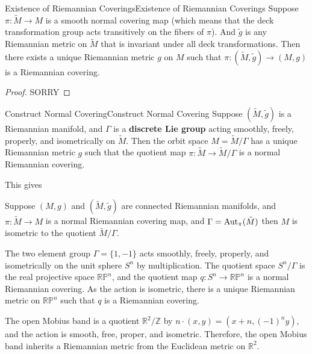 \documentclass[../main.tex]{subfiles}
\begin{document}
\begin{proposition}{Existence of Riemannian Coverings}{Existence of Riemannian Coverings}
	Suppose $\pi: \tilde{M} \to M$ is a smooth normal covering map (which means that the deck transformation group acts transitively on the fibers of $\pi$). And $\tilde{g}$ is any Riemannian metric on $\tilde{M}$ that is invariant under all deck transformations. Then there exists a unique Riemannian metric $g$ on $M$ such that $\pi: (\tilde{M}, \tilde{g}) \to (M, g)$ is a Riemannian covering.
\end{proposition}
\begin{proof}
	SORRY
\end{proof}

\begin{proposition}{Construct Normal Covering}{Construct Normal Covering}
	Suppose $(\tilde{M}, \tilde{g})$ is a Riemannian manifold, and $\Gamma$ is a \textbf{discrete Lie group} acting smoothly, freely, properly, and isometrically on $\tilde{M}$. Then the orbit space $M = \tilde{M}/\Gamma$ has a unique Riemannian metric $g$ such that the quotient map $\pi: \tilde{M} \to \tilde{M}/\Gamma$ is a normal Riemannian covering.
\end{proposition}

This gives
\begin{proposition}{}{}
	Suppose $(M, g)$ and $(\tilde{M}, \tilde{g})$ are connected Riemannian manifolds, and $\pi: \tilde{M} \to M$ is a normal Riemannian covering map, and $\Gamma = \operatorname{Aut}_\pi(\tilde{M})$ then $M$ is isometric to the quotient $\tilde{M}/\Gamma$.
\end{proposition}

\begin{example}{}{}
	The two element group $\Gamma = \{1, -1\}$ acts smoothly, freely, properly, and isometrically on the unit sphere $S^n$ by multiplication. The quotient space $S^n/\Gamma$ is the real projective space $\mathbb{RP}^n$, and the quotient map $q: S^n \to \mathbb{RP}^n$ is a normal Riemannian covering. As the action is isometric, there is a unique Riemannian metric on $\mathbb{RP}^n$ such that $q$ is a Riemannian covering.
\end{example}

\begin{example}{}{}
	The open Mobius band is a quotient $\mathbb{R}^2/\mathbb{Z}$ by $n \cdot (x, y) = (x+n, (-1)^n y)$, and the action is smooth, free, proper, and isometric. Therefore, the open Mobius band inherits a Riemannian metric from the Euclidean metric on $\mathbb{R}^2$.
\end{example}
\end{document}
